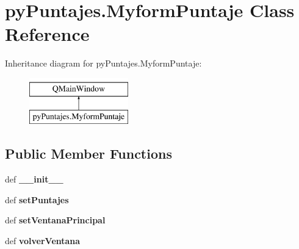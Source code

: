 \hypertarget{classpy_puntajes_1_1_myform_puntaje}{\section{py\-Puntajes.\-Myform\-Puntaje Class Reference}
\label{classpy_puntajes_1_1_myform_puntaje}
}
Inheritance diagram for py\-Puntajes.\-Myform\-Puntaje\-:\begin{figure}[H]
\begin{center}
\leavevmode
\includegraphics[height=2.000000cm]{classpy_puntajes_1_1_myform_puntaje}
\end{center}
\end{figure}
\subsection*{Public Member Functions}
\begin{DoxyCompactItemize}
\item 
\hypertarget{classpy_puntajes_1_1_myform_puntaje_a494f3dad0f72dec76b44463c06da2b7c}{def {\bfseries \-\_\-\-\_\-init\-\_\-\-\_\-}}\label{classpy_puntajes_1_1_myform_puntaje_a494f3dad0f72dec76b44463c06da2b7c}

\item 
\hypertarget{classpy_puntajes_1_1_myform_puntaje_a2cab2c6564cd5aac0d4a81c9f7ccb11c}{def {\bfseries set\-Puntajes}}\label{classpy_puntajes_1_1_myform_puntaje_a2cab2c6564cd5aac0d4a81c9f7ccb11c}

\item 
\hypertarget{classpy_puntajes_1_1_myform_puntaje_a87541d36caacfbecc554dc915e812f2b}{def {\bfseries set\-Ventana\-Principal}}\label{classpy_puntajes_1_1_myform_puntaje_a87541d36caacfbecc554dc915e812f2b}

\item 
\hypertarget{classpy_puntajes_1_1_myform_puntaje_a33ec28b841e9f14570491bbbc0a2ba05}{def {\bfseries volver\-Ventana}}\label{classpy_puntajes_1_1_myform_puntaje_a33ec28b841e9f14570491bbbc0a2ba05}

\end{DoxyCompactItemize}
